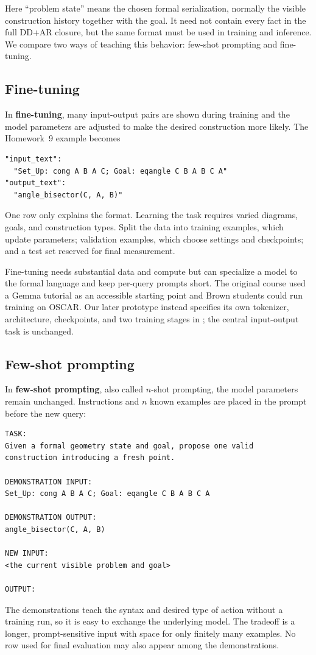 \documentclass[reqno]{amsart}
\newcommand{\keyterm}[1]{\textbf{\color{agblue}#1}}
\DeclareMathOperator{\1}{\textbf{1}}
\begin{document}
Here ``problem state'' means the chosen formal serialization, normally the
visible construction history together with the goal. It need not contain every
fact in the full DD+AR closure, but the same format must be used in training
and inference. We compare two ways of teaching this behavior: few-shot
prompting and fine-tuning.

\subsection{Fine-tuning}

In \keyterm{fine-tuning}, many input-output pairs are shown during training
and the model parameters are adjusted to make the desired construction more
likely. The Homework~9 example becomes
\begin{lstlisting}
"input_text":
  "Set_Up: cong A B A C; Goal: eqangle C B A B C A"
"output_text":
  "angle_bisector(C, A, B)"
\end{lstlisting}
One row only explains the format. Learning the task requires varied diagrams,
goals, and construction types. Split the data into training examples, which
update parameters; validation examples, which choose settings and checkpoints;
and a test set reserved for final measurement.

Fine-tuning needs substantial data and compute but can specialize a model to
the formal language and keep per-query prompts short. The original course used
a Gemma tutorial as an accessible starting point and Brown students could run
training on OSCAR. Our later prototype instead specifies its own tokenizer,
architecture, checkpoints, and two training stages in
; the central input-output task is unchanged.

\subsection{Few-shot prompting}\label{sec: n-shot prompting}

In \keyterm{few-shot prompting}, also called $n$-shot prompting, the model
parameters remain unchanged. Instructions and $n$ known examples are placed in
the prompt before the new query:
\begin{lstlisting}
TASK:
Given a formal geometry state and goal, propose one valid
construction introducing a fresh point.

DEMONSTRATION INPUT:
Set_Up: cong A B A C; Goal: eqangle C B A B C A

DEMONSTRATION OUTPUT:
angle_bisector(C, A, B)

NEW INPUT:
<the current visible problem and goal>

OUTPUT:
\end{lstlisting}
The demonstrations teach the syntax and desired type of action without a
training run, so it is easy to exchange the underlying model. The tradeoff is
a longer, prompt-sensitive input with space for only finitely many examples.
No row used for final evaluation may also appear among the demonstrations.
\end{document}
